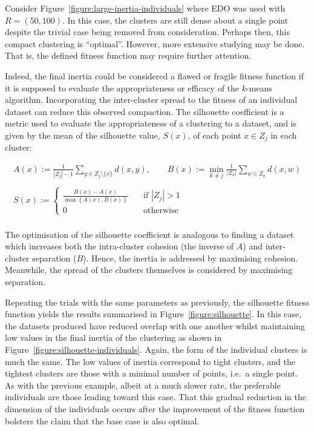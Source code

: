 Consider Figure~\ref{figure:large-inertia-individuals} where EDO was used with
\(R = (50, 100)\). In this case, the clusters are still dense about a single
point despite the trivial case being removed from consideration. Perhaps then,
this compact clustering is ``optimal''. However, more extensive studying may be
done. That is, the defined fitness function may require further attention.

Indeed, the final inertia could be considered a flawed or fragile fitness
function if it is supposed to evaluate the appropriateness or efficacy of the
\(k\)-means algorithm. Incorporating the inter-cluster spread to the fitness of
an individual dataset can reduce this observed compaction. The silhouette
coefficient is a metric used to evaluate the appropriateness of a clustering to
a dataset, and is given by the mean of the silhouette value, \(S(x)\), of each
point \(x \in Z_j\) in each cluster:

\begin{equation}
    \begin{gathered}
        A(x) := \frac{1}{|Z_j| - 1} \sum_{y \in Z_j \setminus \{x\}} d(x, y),
        \qquad B(x) := \min_{k \neq j} \frac{1}{|Z_k|} \sum_{w \in Z_k} d(x, w)
        \\\\
        S(x) := 
            \begin{cases}
                \frac{B(x) - A(x)}{\max\left\{A(x), B(x)\right\}}
                &\quad \text{if } |Z_j| > 1\\
                0 &\quad \text{otherwise}
            \end{cases}\label{eq:silhouette}
    \end{gathered}
\end{equation}\\

The optimisation of the silhouette coefficient is analogous to finding a dataset
which increases both the intra-cluster cohesion (the inverse of \(A\)) and
inter-cluster separation (\(B\)). Hence, the inertia is addressed by maximising
cohesion. Meanwhile, the spread of the clusters themselves is considered by
maximising separation.

Repeating the trials with the same parameters as previously, the silhouette
fitness function yields the results summarised in
Figure~\ref{figure:silhouette}. In this case, the datasets produced have reduced
overlap with one another whilst maintaining low values in the final inertia of
the clustering as shown in Figure~\ref{figure:silhouette-individuals}. Again,
the form of the individual clusters is much the same. The low values of inertia
correspond to tight clusters, and the tightest clusters are those with a minimal
number of points, i.e.\ a single point. As with the previous example, albeit at
a much slower rate, the preferable individuals are those leading toward this
case. That this gradual reduction in the dimension of the individuals occurs
after the improvement of the fitness function bolsters the claim that the base
case is also optimal.

